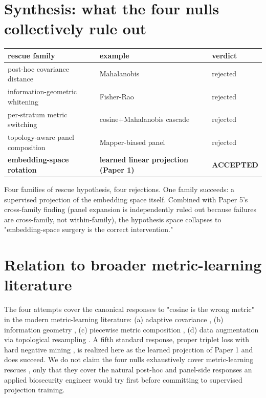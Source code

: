 \documentclass[11pt]{article}
\begin{document}
\section{Synthesis: what the four nulls collectively rule out}
\begin{center}\small
\begin{tabular}{lll}
\toprule
rescue family & example & verdict \\
\midrule
post-hoc covariance distance & Mahalanobis \cite{ledoit2004} & rejected \\
information-geometric whitening & Fisher-Rao \cite{amari2016} & rejected \\
per-stratum metric switching & cosine+Mahalanobis cascade & rejected \\
topology-aware panel composition & Mapper-biased panel & rejected \\
\midrule
\textbf{embedding-space rotation} & \textbf{learned linear projection (Paper 1)} & \textbf{ACCEPTED} \\
\bottomrule
\end{tabular}\end{center}

Four families of rescue hypothesis, four rejections. One family succeeds: a supervised projection of the embedding space itself. Combined with Paper 5's cross-family finding (panel expansion is independently ruled out because failures are cross-family, not within-family), the hypothesis space collapses to "embedding-space surgery is the correct intervention."

\section{Relation to broader metric-learning literature}
The four attempts cover the canonical responses to "cosine is the wrong metric" in the modern metric-learning literature: (a) adaptive covariance \cite{weinberger2009distance,ledoit2004,guo2017calibration}, (b) information geometry \cite{amari2016,ovadia2019shift}, (c) piecewise metric composition \cite{johnson2019billion}, (d) data augmentation via topological resampling \cite{singh2007topological,carlsson2009topology,edelsbrunner2010computational}. A fifth standard response, proper triplet loss with hard negative mining \cite{schroff2015facenet}, is realized here as the learned projection of Paper 1 and does succeed. We do not claim the four nulls exhaustively cover metric-learning rescues \cite{elnaggar2022prottrans,brandes2022proteinbert,madani2023progen,hayes2024esm3,su2023saprot,rives2021biological,fu2012cdhit,steinegger2017mmseqs2,vankempen2024foldseek,littmann2021embeddings,nosek2018preregistration,forde2019scientific,urbina2022dualuse,kilinc2023protein}, only that they cover the natural post-hoc and panel-side responses an applied biosecurity engineer would try first before committing to supervised projection training.
\end{document}
